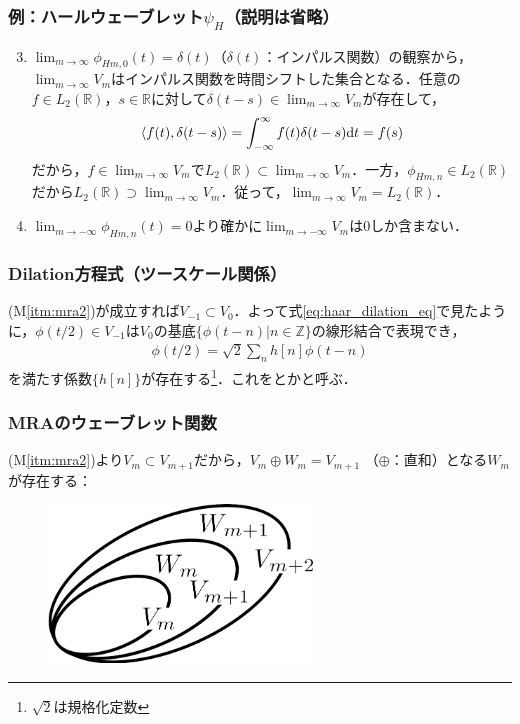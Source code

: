\documentclass[dvipdfmx,graphicx,14pt]{beamer}
\begin{document}
\begin{frame}[c]
    \frametitle{例：ハールウェーブレット$\psi_{H}$\small（説明は省略）}
    \begin{enumerate}[(M1)]
            \setcounter{enumi}{2}
        \item \small
            $\displaystyle\lim_{m\to\infty} \phi_{Hm,0}(t) = \delta(t)$（$\delta(t)$：インパルス関数）の観察から，$\displaystyle\lim_{m\to\infty}V_{m}$はインパルス関数を時間シフトした集合となる．任意の$f \in L_{2}(\mathbb{R})$，$s \in \mathbb{R}$に対して$\delta(t - s) \in \displaystyle\lim_{m\to\infty}V_{m}$が存在して，
            \begin{align*}
                \langle f(t), \delta(t - s) \rangle = \int_{-\infty}^{\infty} f(t) \delta(t - s) \mathrm{d} t = f(s)
            \end{align*}
            だから，$f \in \displaystyle\lim_{m\to\infty}V_{m}$で$L_{2}(\mathbb{R}) \subset \displaystyle\lim_{m\to\infty}V_{m}$．一方，$\phi_{Hm,n} \in L_{2}(\mathbb{R})$だから$L_{2}(\mathbb{R})\supset \displaystyle\lim_{m\to\infty}V_{m}$．従って，$\displaystyle\lim_{m\to\infty}V_{m} = L_{2}(\mathbb{R})$．
            \normalsize
        \item $\displaystyle\lim_{m\to-\infty} \phi_{Hm,n}(t) = 0$より確かに$\displaystyle\lim_{m\to-\infty}V_{m}$は$0$しか含まない．
    \end{enumerate}
\end{frame}

\begin{frame}[c]
    \frametitle{Dilation方程式（ツースケール関係）}
    (M\ref{itm:mra2})が成立すれば$V_{-1} \subset V_{0}$．よって式\eqref{eq:haar_dilation_eq}で見たように，$\phi(t/2) \in V_{-1}$は$V_{0}$の基底$\{ \phi(t-n) | n \in \mathbb{Z} \}$の線形結合で表現でき，
    \begin{align}
        \phi(t/2) = \sqrt{2} \sum_{n} h[n] \phi(t - n) \label{eq:dilation_eq}
    \end{align}
    を満たす係数$\{ h[n] \}$が存在する\footnote{$\sqrt{2}$は規格化定数}．これをとかと呼ぶ．
\end{frame}

\begin{frame}[c]
    \frametitle{MRAのウェーブレット関数}
    (M\ref{itm:mra2})より$V_{m} \subset V_{m+1}$だから，$V_{m} \oplus W_{m} = V_{m+1}$ （$\oplus$：直和）となる$W_{m}$が存在する：\\
    \begin{figure}
        \includegraphics[width=70mm]{./figs/mra_scaling_wavelet_set.png}
    \end{figure}
\end{frame}
\end{document}
